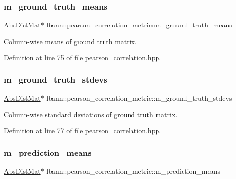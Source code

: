 \subsubsection{\texorpdfstring{m\+\_\+ground\+\_\+truth\+\_\+means}{m\_ground\_truth\_means}}
{\footnotesize\ttfamily \hyperlink{base_8hpp_a9a697a504ae84010e7439ffec862b470}{Abs\+Dist\+Mat}$\ast$ lbann\+::pearson\+\_\+correlation\+\_\+metric\+::m\+\_\+ground\+\_\+truth\+\_\+means\hspace{0.3cm}{\ttfamily [private]}}

Column-\/wise means of ground truth matrix. 

Definition at line 75 of file pearson\+\_\+correlation.\+hpp.

\mbox{\label{classlbann_1_1pearson__correlation__metric_a7ed5e7a1778d17f852f4277afcaa31ed}} 
\subsubsection{\texorpdfstring{m\+\_\+ground\+\_\+truth\+\_\+stdevs}{m\_ground\_truth\_stdevs}}
{\footnotesize\ttfamily \hyperlink{base_8hpp_a9a697a504ae84010e7439ffec862b470}{Abs\+Dist\+Mat}$\ast$ lbann\+::pearson\+\_\+correlation\+\_\+metric\+::m\+\_\+ground\+\_\+truth\+\_\+stdevs\hspace{0.3cm}{\ttfamily [private]}}

Column-\/wise standard deviations of ground truth matrix. 

Definition at line 77 of file pearson\+\_\+correlation.\+hpp.

\mbox{\label{classlbann_1_1pearson__correlation__metric_ac664eebee2c3d3287848c570400bdddb}} 
\subsubsection{\texorpdfstring{m\+\_\+prediction\+\_\+means}{m\_prediction\_means}}
{\footnotesize\ttfamily \hyperlink{base_8hpp_a9a697a504ae84010e7439ffec862b470}{Abs\+Dist\+Mat}$\ast$ lbann\+::pearson\+\_\+correlation\+\_\+metric\+::m\+\_\+prediction\+\_\+means\hspace{0.3cm}{\ttfamily [private]}}

